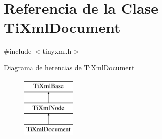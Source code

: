 \hypertarget{classTiXmlDocument}{\section{\-Referencia de la \-Clase \-Ti\-Xml\-Document}
\label{classTiXmlDocument}
}


{\ttfamily \#include $<$tinyxml.\-h$>$}

\-Diagrama de herencias de \-Ti\-Xml\-Document\begin{figure}[H]
\begin{center}
\leavevmode
\includegraphics[height=3.000000cm]{classTiXmlDocument}
\end{center}
\end{figure}
